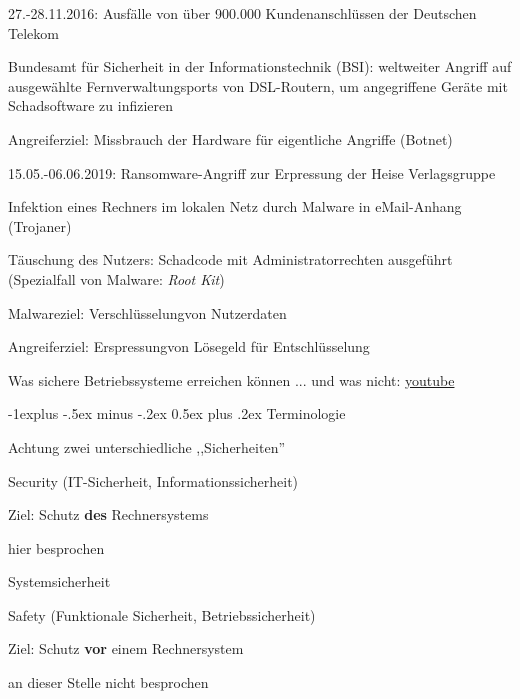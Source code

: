 \documentclass[a4paper]{article}
\makeatletter
\renewcommand{\subsection}{\@startsection{subsection}{2}{0mm}%
 {-1explus -.5ex minus -.2ex}%
 {0.5ex plus .2ex}%
 {\normalfont\normalsize\bfseries}}
\makeatother
\begin{document}
\begin{multicols}{3}
    \begin{itemize*}
        \item
        27.-28.11.2016: Ausfälle von über 900.000 Kundenanschlüssen der
        Deutschen Telekom
        \begin{itemize*}
            \item Bundesamt für Sicherheit in der Informationstechnik (BSI): weltweiter Angriff auf ausgewählte Fernverwaltungsports von DSL-Routern, um angegriffene Geräte mit Schadsoftware zu infizieren
            \item Angreiferziel: Missbrauch der Hardware für eigentliche Angriffe (Botnet)
        \end{itemize*}
        \item
        15.05.-06.06.2019: Ransomware-Angriff zur Erpressung der Heise
        Verlagsgruppe
        \begin{itemize*}
            \item Infektion eines Rechners im lokalen Netz durch Malware in eMail-Anhang (Trojaner)
            \item Täuschung des Nutzers: Schadcode mit Administratorrechten ausgeführt (Spezialfall von Malware: \emph{Root Kit})
            \item Malwareziel: Verschlüsselungvon Nutzerdaten
            \item Angreiferziel: Erspressungvon Lösegeld für Entschlüsselung
        \end{itemize*}
    \end{itemize*}

    Was sichere Betriebssysteme erreichen können ... und was nicht:
    \href{https://www.youtube.com/watch?v=opRMrEfAIiI\&t=}{youtube}


    \subsection{Terminologie}

    Achtung zwei unterschiedliche ,,Sicherheiten''

    \begin{enumerate*}
        \item
        Security (IT-Sicherheit, Informationssicherheit)
        \begin{itemize*}
            \item Ziel: Schutz \textbf{des} Rechnersystems
            \item hier besprochen
            \item Systemsicherheit
        \end{itemize*}
        \item
        Safety (Funktionale Sicherheit, Betriebssicherheit)
        \begin{itemize*}
            \item Ziel: Schutz \textbf{vor} einem Rechnersystem
            \item an dieser Stelle nicht besprochen
        \end{itemize*}
    \end{enumerate*}


\end{multicols}
\end{document}
